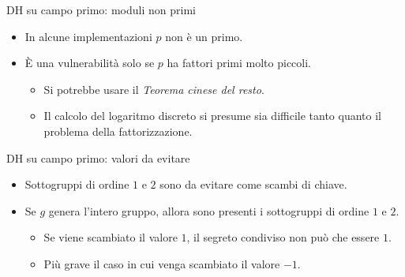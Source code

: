 \documentclass[11pt,svgnames,smaller,aspectratio=169,italian]{beamer}
\begin{document}
\begin{frame}{DH su campo primo: moduli non primi}
	\begin{itemize}
		\item In alcune implementazioni $p$ non è un primo.
		\item È una vulnerabilità solo se $p$ ha fattori primi molto piccoli.
			\begin{itemize}
				\item Si potrebbe usare il \emph{Teorema cinese del resto}.
				\item Il calcolo del logaritmo discreto si presume sia difficile tanto quanto il problema della fattorizzazione.
			\end{itemize}
	\end{itemize}
\end{frame}

\begin{frame}{DH su campo primo: valori da evitare}
	\begin{itemize}
		\item Sottogruppi di ordine $1$ e $2$ sono da evitare come scambi di chiave.
		\item Se $g$ genera l'intero gruppo, allora sono presenti i sottogruppi di ordine $1$ e $2$.
			\begin{itemize}
				\item Se viene scambiato il valore $1$, il segreto condiviso non può che essere $1$.
				\item Più grave il caso in cui venga scambiato il valore $-1$.
			\end{itemize}
	\end{itemize}
\end{frame}
\end{document}
